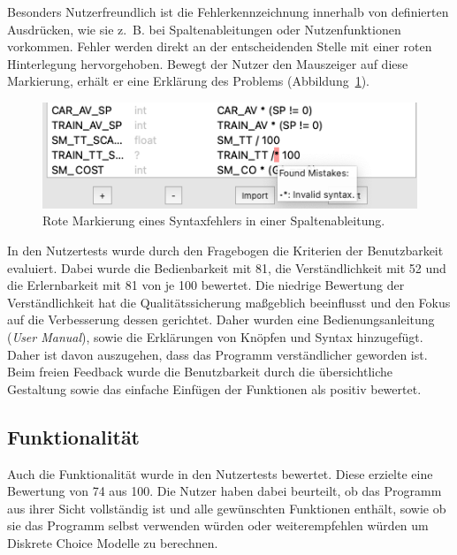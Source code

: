 \documentclass{article}
\begin{document}
Besonders Nutzerfreundlich ist die Fehlerkennzeichnung innerhalb von definierten Ausdrücken, wie sie z.~B. bei Spaltenableitungen oder Nutzenfunktionen vorkommen. Fehler werden direkt an der entscheidenden Stelle mit einer roten Hinterlegung hervorgehoben. Bewegt der Nutzer den Mauszeiger auf diese Markierung, erhält er eine Erklärung des Problems (Abbildung~\ref{gui:fig_expression-error-syntax}).\\

\begin{figure}[H]%
  \centering
  \includegraphics[width=12cm]{img/gui/expression-error-syntax.png}
  \caption{Rote Markierung eines Syntaxfehlers in einer Spaltenableitung.}
  \label{gui:fig_expression-error-syntax}
\end{figure}

In den Nutzertests wurde durch den Fragebogen die Kriterien der Benutzbarkeit evaluiert. Dabei wurde die Bedienbarkeit mit 81, die Verständlichkeit mit 52 und die Erlernbarkeit mit 81 von je 100 bewertet. Die niedrige Bewertung der Verständlichkeit hat die Qualitätssicherung maßgeblich beeinflusst und den Fokus auf die Verbesserung dessen gerichtet. Daher wurden eine Bedienungsanleitung (\emph{User Manual}), sowie die Erklärungen von Knöpfen und Syntax hinzugefügt. Daher ist davon auszugehen, dass das Programm verständlicher geworden ist.\\

Beim freien Feedback wurde die Benutzbarkeit durch die übersichtliche Gestaltung sowie das einfache Einfügen der Funktionen als positiv bewertet.

\subsection{Funktionalität}

Auch die Funktionalität wurde in den Nutzertests bewertet. Diese erzielte eine Bewertung von 74 aus 100. Die Nutzer haben dabei beurteilt, ob das Programm aus ihrer Sicht vollständig ist und alle gewünschten Funktionen enthält, sowie ob sie das Programm selbst verwenden würden oder weiterempfehlen würden um Diskrete Choice Modelle zu berechnen.\\
\end{document}
